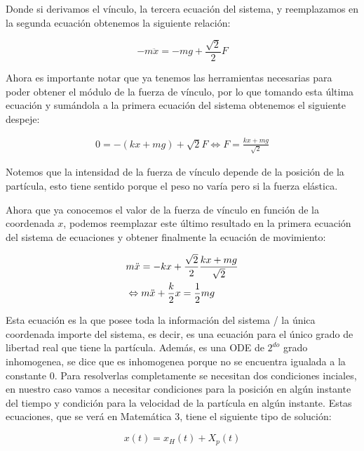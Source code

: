 \documentclass{article}
\begin{document}
\begin{multicols}{2}
Donde si derivamos el vínculo, la tercera ecuación del sistema, y reemplazamos en la segunda ecuación obtenemos la siguiente relación:

\begin{equation}
    -m\ddot{x} = -mg + \frac{\sqrt{2}}{2}F
\end{equation}

Ahora es importante notar que ya tenemos las herramientas necesarias para poder obtener el módulo de la fuerza de vínculo, por lo que tomando esta última ecuación y sumándola a la primera ecuación del sistema obtenemos el siguiente despeje:

\begin{equation}
\begin{split}
    0 = -(kx + mg) + \sqrt{2}F
    \Leftrightarrow F = \frac{kx + mg}{\sqrt{2}}
\end{split}
\end{equation}

Notemos que la intensidad de la fuerza de vínculo depende de la posición de la partícula, esto tiene sentido porque el peso no varía pero si la fuerza elástica.

Ahora que ya conocemos el valor de la fuerza de vínculo en función de la coordenada $x$, podemos reemplazar este último resultado en la primera ecuación del sistema de ecuaciones y obtener finalmente la ecuación de movimiento:

\begin{equation}
    \centering
    \begin{split}
        &m\ddot{x} = -kx + \frac{\sqrt{2}}{2}\frac{kx + mg}{\sqrt{2}} \\
        &\Leftrightarrow m\ddot{x} + \frac{k}{2}x = \frac{1}{2}mg
    \end{split}
\end{equation}

Esta ecuación es la que posee toda la información del sistema / la única coordenada importe del sistema, es decir, es una ecuación para el único grado de libertad real que tiene la partícula. Además, es una ODE de $2^{do}$ grado inhomogenea, se dice que es inhomogenea porque no se encuentra igualada a la constante $0$. Para resolverlas completamente se necesitan dos condiciones inciales, en nuestro caso vamos a necesitar condiciones para la posición en algún instante del tiempo y condición para la velocidad de la partícula en algún instante. Estas ecuaciones, que se verá en Matemática 3, tiene el siguiente tipo de solución:

\begin{equation}
    x(t) = x_H(t) + X_p(t)
\end{equation}


\end{multicols}
\end{document}
